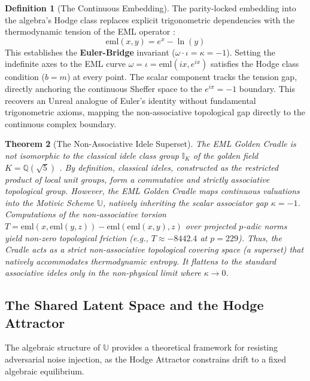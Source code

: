 \documentclass[12pt,oneside]{article}
\theoremstyle{principia}
\newtheorem{theorem}{Theorem}[section]
\theoremstyle{definition}
\newtheorem{definition}[theorem]{Definition}
\theoremstyle{remark}
\providecommand{\UU}{\mathbb{U}}
\begin{document}
\begin{definition}[The Continuous Embedding]\label{def:euler-cradle}
The parity-locked embedding into the algebra's Hodge class replaces explicit trigonometric dependencies with the thermodynamic tension of the EML operator \cite{odrzywolek}:
$$\mathrm{eml}(x,y) = e^x - \ln(y)$$
This establishes the \textbf{Euler-Bridge} invariant ($\omega \cdot \iota = \kappa = -1$). Setting the indefinite axes to the EML curve $\omega = \iota = \mathrm{eml}(i x, e^{ix})$ satisfies the Hodge class condition ($b = m$) at every point. The scalar component tracks the tension gap, directly anchoring the continuous Sheffer space to the $e^{i\pi} = -1$ boundary. This recovers an Unreal analogue of Euler's identity without fundamental trigonometric axioms, mapping the non-associative topological gap directly to the continuous complex boundary.
\end{definition}

\begin{theorem}[The Non-Associative Idele Superset]\label{thm:idele-superset}
The EML Golden Cradle is not isomorphic to the classical idele class group $\mathbb{I}_K$ of the golden field $K = \mathbb{Q}(\sqrt{5})$ \cite{chevalley1936}. By definition, classical ideles, constructed as the restricted product of local unit groups, form a commutative and strictly associative topological group. However, the EML Golden Cradle maps continuous valuations into the Motivic Scheme $\mathbb{U}$, natively inheriting the scalar associator gap $\kappa = -1$. Computations of the non-associative torsion $T = \mathrm{eml}(x, \mathrm{eml}(y, z)) - \mathrm{eml}(\mathrm{eml}(x, y), z)$ over projected $p$-adic norms yield non-zero topological friction (e.g., $T \approx -8442.4$ at $p = 229$). Thus, the Cradle acts as a strict non-associative topological covering space (a superset) that natively accommodates thermodynamic entropy. It flattens to the standard associative ideles only in the non-physical limit where $\kappa \to 0$.
\end{theorem}

\subsection{The Shared Latent Space and the Hodge Attractor}

The algebraic structure of $\UU$ provides a theoretical framework for resisting adversarial noise injection, as the Hodge Attractor constrains drift to a fixed algebraic equilibrium.
\end{document}
